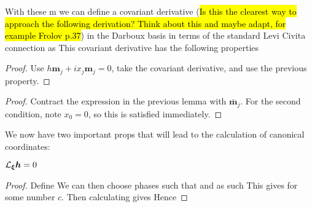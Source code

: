 \documentclass{article}
\begin{document}
With these m we can define a covariant derivative (\hl{Is this the clearest way to approach the following derivation? Think about this and maybe adapt, for example Frolov p.37}) in the Darboux basis in terms of the standard Levi Civita connection as 
This covariant derivative has the following properties 
\begin{lemma}
\end{lemma}
\begin{lemma}
\end{lemma}
\begin{proof}
Use $h\bm{m}_j +ix_j \bm{m}_j = 0$, take the covariant derivative, and use the previous property.
\end{proof}

\begin{lemma}
\end{lemma}
\begin{proof}
Contract the expression in the previous lemma with $\bar{\bm{m}}_j$. For the second condition, note $x_0 = 0$, so this is satisfied immediately. 
\end{proof}


We now have two important props that will lead to the calculation of canonical coordinates:

\begin{prop}
$ \mathcal{L}_{\bm{\xi}} \bm{h} = 0 $
\end{prop}
\begin{proof}
Define 
We can then choose phases such that 
and as such 
This gives
for some number $c$. Then calculating
gives 
Hence 

\end{proof}
\end{document}
